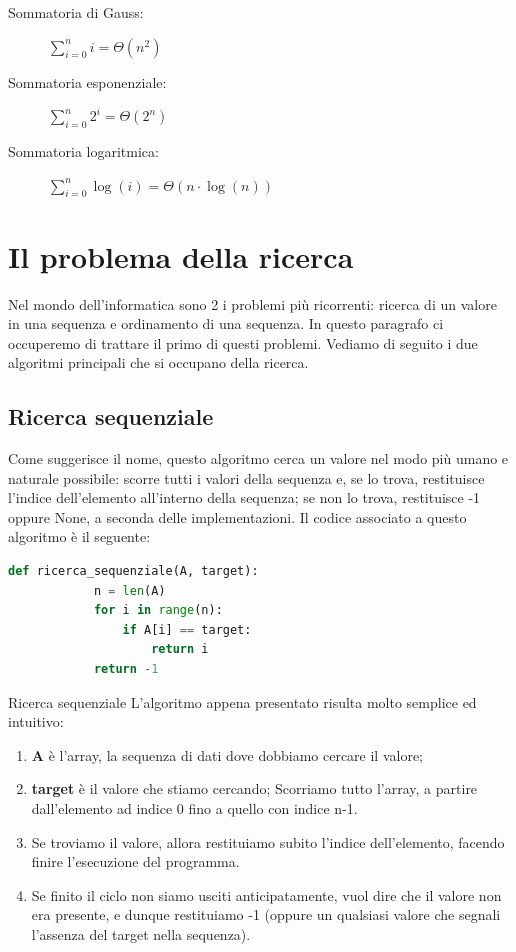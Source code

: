 \documentclass[12pt]{report}
\begin{document}
	\begin{description}
		\item [Sommatoria di Gauss:] $\sum_{i=0}^{n} i = \Theta(n^2)$
		\item [Sommatoria esponenziale: ] $\sum_{i=0}^{n} 2^i = \Theta(2^n)$
		\item [Sommatoria logaritmica: ] $\sum_{i=0}^{n} \log(i) = \Theta(n\cdot\log(n))$
	\end{description}
    
    \newpage
    \chapter{Il problema della ricerca}
    Nel mondo dell’informatica sono 2 i problemi più ricorrenti: ricerca di un valore in una sequenza e ordinamento di una sequenza. In questo paragrafo ci occuperemo di trattare il primo di questi problemi.
	Vediamo di seguito i due algoritmi principali che si occupano della ricerca.
    	
	\section{Ricerca sequenziale}
	Come suggerisce il nome, questo algoritmo cerca un valore nel modo più umano e naturale possibile: scorre tutti i valori della sequenza e, se lo trova, restituisce l’indice dell’elemento all’interno della sequenza; se non lo trova, restituisce -1 oppure None, a seconda delle implementazioni.
	Il codice associato a questo algoritmo è il seguente:
    		
	\begin{lstlisting}[language=Python, caption={Codice della ricerca sequenziale}]
    	def ricerca_sequenziale(A, target):
    		n = len(A)
    		for i in range(n):
    			if A[i] == target:
    				return i
    		return -1
    \end{lstlisting}
    		
	\begin{algoritmo}{Ricerca sequenziale}{}
    	L'algoritmo appena presentato risulta molto semplice ed intuitivo:
    	\begin{enumerate}
    				
    		\item \textbf{A} è l’array, la sequenza di dati dove 
    				dobbiamo cercare il valore;
    				
    		\item \textbf{target} è il valore che stiamo cercando;
    		Scorriamo tutto l’array, a partire dall’elemento ad indice 0 fino a quello con indice n-1.
    		
    		\item Se troviamo il valore, allora restituiamo subito l’indice dell’elemento, facendo finire l’esecuzione del programma.
    		
    		\item Se finito il ciclo non siamo usciti anticipatamente, vuol dire che il valore non era presente, e dunque restituiamo -1 (oppure un qualsiasi valore che segnali l'assenza del target nella sequenza).
    	
    	\end{enumerate}
    \end{algoritmo}
    		
\end{document}
